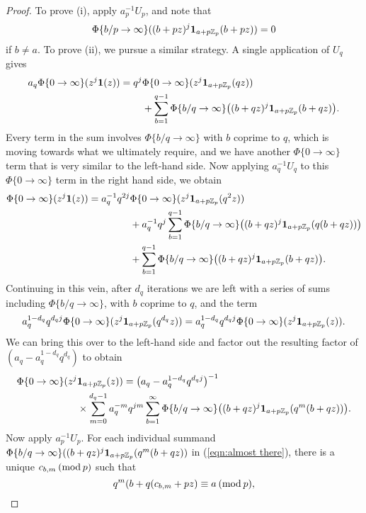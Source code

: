 \documentclass[a4paper,11pt]{article}
\numberwithin{equation}{section}
\begin{document}
\begin{proof}
To prove (i), apply $a_p^{-1}U_p$, and note that 
\[
 \Phi\{b/p \rightarrow \infty\}((b+pz)^j\mathbf{1}_{a+p\mathbb{Z}_p}(b+pz)) = 0
\]
if $b \neq a$. To prove (ii), we pursue a similar strategy. A single application of $U_q$ gives
\begin{align*}
 a_q\Phi\{0\rightarrow\infty\}(z^j\mathbf{1}(z)) = q^j&\Phi\{0\rightarrow\infty\}(z^j\mathbf{1}_{a+p\mathbb{Z}_p}(qz)) \\
&+ \sum_{b = 1}^{q-1}\Phi\{b/q \rightarrow \infty\}\big((b+qz)^j\mathbf{1}_{a+p\mathbb{Z}_p}(b+qz)\big).
\end{align*}
Every term in the sum involves $\Phi\{b/q\rightarrow \infty\}$ with $b$ coprime to $q$, which is moving towards what we ultimately require, and we have another $\Phi\{0\rightarrow\infty\}$ term that is very similar to the left-hand side. Now applying $a_q^{-1}U_q$ to this $\Phi\{0\rightarrow\infty\}$ term in the right hand side, we obtain 
\begin{align*}
 \Phi\{0\rightarrow\infty\}(z^j\mathbf{1}(z)) = a_q^{-1}q^{2j}&\Phi\{0\rightarrow\infty\}(z^j\mathbf{1}_{a+p\mathbb{Z}_p}(q^2z)) \\
&+ a_q^{-1}q^j\sum_{b = 1}^{q-1}\Phi\{b/q \rightarrow \infty\}\big((b+qz)^j\mathbf{1}_{a+p\mathbb{Z}_p}(q(b+qz))\big)\\
&+ \sum_{b = 1}^{q-1}\Phi\{b/q \rightarrow \infty\}\big((b+qz)^j\mathbf{1}_{a+p\mathbb{Z}_p}(b+qz)\big).
\end{align*}
Continuing in this vein, after $d_q$ iterations we are left with a series of sums including $\Phi\{b/q\rightarrow\infty\}$, with $b$ coprime to $q$, and the term
\[
 a_q^{1-d_q}q^{d_qj}\Phi\{0\rightarrow\infty\}(z^j\mathbf{1}_{a+p\mathbb{Z}_p}(q^{d_q}z)) = 
 a_q^{1-d_q}q^{d_qj}\Phi\{0\rightarrow\infty\}(z^j\mathbf{1}_{a+p\mathbb{Z}_p}(z)).
\]
We can bring this over to the left-hand side and factor out the resulting factor of $(a_q - a_q^{1-d_q}q^{d_q})$ to obtain 
\begin{align}\label{eqn:almost there}
\Phi\{0\rightarrow\infty\}(z^j &\mathbf{1}_{a+p\mathbb{Z}_p}(z)) =
\big(a_q -a_q^{1-d_q}q^{d_qj}\big)^{-1}\\\
&\times \sum_{m = 0}^{d_q-1} a_q^{-m}q^{jm}
\sum_{b=1}^\infty \Phi\{b/q\rightarrow \infty\}\big((b + qz)^j\mathbf{1}_{a+p\mathbb{Z}_p}(q^{m}(b+qz))\big).
\end{align}
Now apply $a_p^{-1}U_p$. For each individual summand $\Phi\{b/q \rightarrow \infty\}((b+qz)^j\mathbf{1}_{a+p\mathbb{Z}_p}(q^{m}(b+qz))$ in (\ref{eqn:almost there}), there is a unique $c_{b,m} \hspace{2pt}(\mathrm{mod}\hspace{2pt}p)$ such that 
\[
 q^m(b + q(c_{b,m}+pz) \equiv a \hspace{2pt}(\mathrm{mod}\hspace{2pt}p),
\]
\end{proof}
\end{document}

